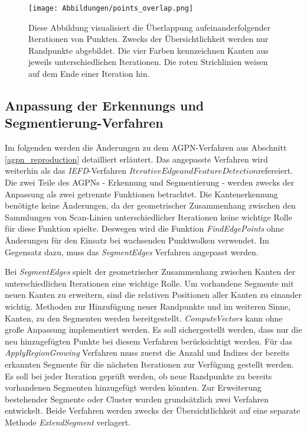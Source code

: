 \begin{figure}[h]
	\texttt{[image: Abbildungen/points\_overlap.png]}
	\centering
	\caption{Diese Abbildung visualisiert die Überlappung aufeinanderfolgender Iterationen von Punkten. Zwecks der Übersichtlichkeit werden nur Randpunkte abgebildet. Die vier Farben kennzeichnen Kanten aus jeweils unterschiedlichen Iterationen. Die roten Strichlinien weisen auf dem Ende einer Iteration hin.}
	\label{fig: point_overlap}
\end{figure}

\subsection{Anpassung der Erkennungs und Segmentierung-Verfahren}
Im folgenden werden die Änderungen zu dem AGPN-Verfahren aus Abschnitt \ref{agpn_reproduction} detailliert erläutert. Das angepasste Verfahren wird weiterhin als das \textit{IEFD}-Verfahren \textit{\(Iterative Edge and Feature Detection\)}refereiert. Die zwei Teile des AGPNs - Erkennung und Segmentierung - werden zwecks der Anpassung als zwei getrennte Funktionen betrachtet. Die Kantenerkennung benötigte keine Änderungen, da der geometrischer Zusammenhang zwischen den Sammlungen von Scan-Linien unterschiedlicher Iterationen keine wichtige Rolle für diese Funktion spielte. Deswegen wird die Funktion \textit{FindEdgePoints} ohne Änderungen für den Einsatz bei wachsenden Punktwolken verwendet. Im Gegensatz dazu, muss das \textit{SegmentEdges} Verfahren angepasst werden.

Bei \textit{SegmentEdges} spielt der geometrischer Zusammenhang zwischen Kanten der unterschiedlichen Iterationen eine wichtige Rolle. Um vorhandene Segmente mit neuen Kanten zu erweitern, sind die relativen Positionen aller Kanten zu einander wichtig. Methoden zur Hinzufügung neuer Randpunkte und im weiteren Sinne, Kanten, zu den Segmenten werden bereitgestellt. \textit{ComputeVectors} kann ohne große Anpassung implementiert werden. Es soll sichergestellt werden, dass nur die neu hinzugefügten Punkte bei diesem Verfahren berücksichtigt werden. Für das \textit{ApplyRegionGrowing} Verfahren muss zuerst die Anzahl und Indizes der bereits erkannten Segmente für die nächsten Iterationen zur Verfügung gestellt werden. Es soll bei jeder Iteration geprüft werden, ob neue Randpunkte zu bereits vorhandenen Segmenten hinzugefügt werden könnten. Zur Erweiterung bestehender Segmente oder Cluster wurden grundsätzlich zwei Verfahren entwickelt. Beide Verfahren werden zwecks der Übersichtlichkeit auf eine separate Methode \textit{ExtendSegment} verlagert.

